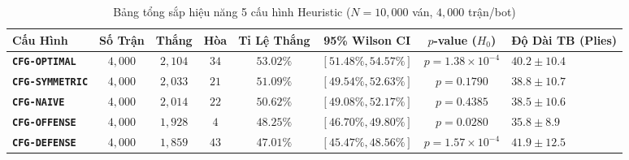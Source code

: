 \documentclass[11pt,a4paper]{article}
\begin{document}
\begin{table}[htbp]
\centering
\small
\caption{Bảng tổng sắp hiệu năng 5 cấu hình Heuristic ($N = 10{,}000$ ván, $4{,}000$ trận/bot)}
\label{tab:standings_10k}
\begin{tabularx}{\textwidth}{l c c c c c c X}
\toprule
\textbf{Cấu Hình} & \textbf{Số Trận} & \textbf{Thắng} & \textbf{Hòa} & \textbf{Tỉ Lệ Thắng} & \textbf{95\% Wilson CI} & \textbf{$p$-value ($H_0$)} & \textbf{Độ Dài TB (Plies)} \\
\midrule
\textbf{\texttt{CFG-OPTIMAL}}   & $4{,}000$ & \textbf{$2{,}104$} & $34$ & \textbf{$53.02\%$} & $[51.48\%, 54.57\%]$ & \textbf{$p = 1.38 \times 10^{-4}$} & $40.2 \pm 10.4$ \\
\textbf{\texttt{CFG-SYMMETRIC}} & $4{,}000$ & $2{,}033$ & $21$ & \textbf{$51.09\%$} & $[49.54\%, 52.63\%]$ & $p = 0.1790$ & $38.8 \pm 10.7$ \\
\textbf{\texttt{CFG-NAIVE}}     & $4{,}000$ & $2{,}014$ & $22$ & $50.62\%$ & $[49.08\%, 52.17\%]$ & $p = 0.4385$ & $38.5 \pm 10.6$ \\
\textbf{\texttt{CFG-OFFENSE}}   & $4{,}000$ & $1{,}928$ & $4$  & $48.25\%$ & $[46.70\%, 49.80\%]$ & $p = 0.0280$ & \textbf{$35.8 \pm 8.9$} \\
\textbf{\texttt{CFG-DEFENSE}}   & $4{,}000$ & $1{,}859$ & $43$ & \textbf{$47.01\%$} & $[45.47\%, 48.56\%]$ & \textbf{$p = 1.57 \times 10^{-4}$} & \textbf{$41.9 \pm 12.5$} \\
\bottomrule
\end{tabularx}
\end{table}
\end{document}
